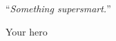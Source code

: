 
\vspace*{0.2\textheight}

\noindent\enquote{\itshape Something supersmart.}\bigbreak

\hfill Your hero